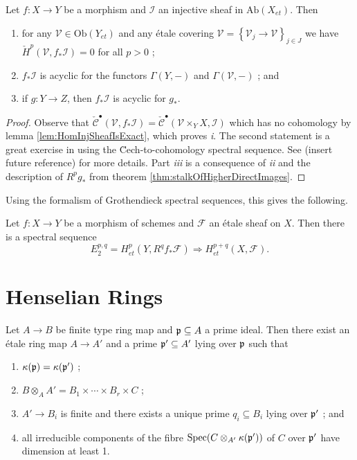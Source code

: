 \begin{lemma}
Let $f: X\to Y$ be a morphism and $\mathcal{I}$ an injective sheaf in 
$\text{Ab}(X_{et})$. Then 
\begin{enumerate}
\item 
for any $\mathcal{V}\in\text{Ob}(Y_{et})$ and any \'etale covering 
$\mathcal{V}=\left\{\mathcal{V}_j\to \mathcal{V}\right\}_{j\in J}$  we have 
$\check H^p(\mathcal{V}, f_*\mathcal{I}) = 0$ for all $p>0$ ;
\item 
$f_*\mathcal{I}$ is acyclic for the functors $\Gamma(Y, -)$ and 
$\Gamma(\mathcal{V},-)$ ; and 
\item 
if $g: Y\to Z$, then $f_*\mathcal{I}$ is acyclic for $g_*$.
\end{enumerate}
\end{lemma}

\begin{proof}
Observe that $\check{\mathcal{C}}^\bullet(\mathcal{V}, f_*\mathcal{I}) = 
\check{\mathcal{C}}^\bullet(\mathcal{V}\times_Y X, \mathcal{I})$ which has no 
cohomology by lemma \ref{lem:HomInjSheafIsExact}, which proves {\it i}. The 
second statement is a great exercise in using the \u Cech-to-cohomology 
spectral sequence. See (insert future reference) for more details. Part {\it 
iii} is a consequence of {\it ii} and the description of $R^pg_*$ from theorem 
\ref{thm:stalkOfHigherDirectImages}. 
\end{proof}

\noindent
Using the formalism of Grothendieck spectral sequences, this gives the 
following.

\begin{proposition}
Let $f: X \to Y$ be a morphism of schemes and $\mathcal{F}$ an \'etale sheaf on 
$X$. Then there is a spectral sequence
$$
E_2^{p,q} = H_{et}^p(Y, R^qf_*\mathcal{F}) \Rightarrow H_{et}^{p+q}(X, 
\mathcal{F}).
$$
\end{proposition}

\section{Henselian Rings}
\label{section-heselian-ring}

\begin{theorem} 
Let $A\to B$ be finite type ring map and $\frak p \subseteq A$ a prime ideal. 
Then there exist an \'etale ring map $A \to A'$ and a prime $\frak p' \subseteq 
A'$ lying over $\frak p$ such that 
\begin{enumerate}
\item 
$\kappa(\frak p) = \kappa(\frak p')$ ;
\item 
$ B \otimes_A A' = B_1\times \cdots \times B_r \times C$ ;
\item 
$ A'\to B_i$ is finite and there exists a unique prime $q_i\subseteq B_i$ lying 
over $\frak p'$ ; and
\item 
all irreducible components of the fibre $\text{Spec}(C\otimes_{A'} \kappa(\frak 
p'))$ of $C$ over $\frak p'$ have dimension at least 1.
\end{enumerate}
\end{theorem}

